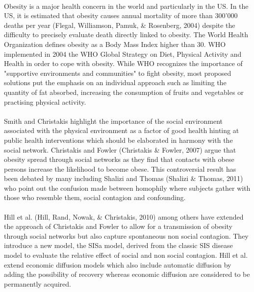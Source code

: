 \documentclass[11pt]{article}
\begin{document}
\paragraph{}
Obesity is a major health concern in the world and particularly in the US. In the US, it is estimated that obesity causes annual mortality of more than 300'000 deaths per year (Flegal, Williamson, Pamuk, & Rosenberg, 2004) despite the difficulty to precisely evaluate death directly linked to obesity. The World Health Organization defines obesity as a Body Mass Index higher than 30. WHO implemented in 2004 the WHO Global Strategy on Diet, Physical Activity and Health in order to cope with obesity. While WHO recognizes the importance of "supportive environments and communities" to fight obesity, most proposed solutions put the emphasis on an individual approach such as limiting the quantity of fat absorbed, increasing the consumption of fruits and vegetables or practising physical activity. 

\paragraph{}
Smith and Christakis  highlight the importance of the social environment associated with the physical environment as a factor of good health hinting at public health interventions which should be elaborated in harmony with the social network. Christakis and Fowler (Christakis & Fowler, 2007) argue that obesity spread  through social networks as they find that contacts with obese persons increase the likelihood to become obese. This controversial result has been debated by many including Shalizi and Thomas (Shalizi & Thomas, 2011) who point out the confusion made between homophily where subjects gather with those who resemble them, social contagion and confounding.

\paragraph{}
Hill et al. (Hill, Rand, Nowak, & Christakis, 2010) among others have extended the approach of Christakis and Fowler to allow for a transmission of obesity through social networks but also capture spontaneous non social contagion. They introduce a new model, the SISa model, derived from the classic SIS disease model to evaluate the relative effect of social and non social contagion. Hill et al. extend economic diffusion models which also include automatic diffusion by adding the possibility of recovery whereas economic diffusion are considered to be permanently acquired.
\end{document}
